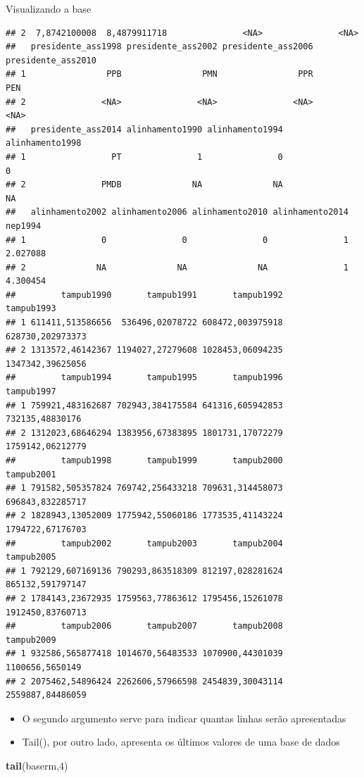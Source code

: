 \documentclass[
  10pt,
  ignorenonframetext,
]{beamer}
\newenvironment{Shaded}{\begin{snugshade}}{\end{snugshade}}
\newcommand{\DecValTok}[1]{\textcolor[rgb]{0.00,0.00,0.81}{#1}}
\newcommand{\KeywordTok}[1]{\textcolor[rgb]{0.13,0.29,0.53}{\textbf{#1}}}
\newcommand{\NormalTok}[1]{#1}
\providecommand{\tightlist}{%
  \setlength{\itemsep}{0pt}\setlength{\parskip}{0pt}}
\begin{document}
\begin{frame}[fragile]{Visualizando a base}
\begin{verbatim}
## 2  7,8742100008  8,4879911718               <NA>               <NA>
##   presidente_ass1998 presidente_ass2002 presidente_ass2006 presidente_ass2010
## 1                PPB                PMN                PPR                PEN
## 2               <NA>               <NA>               <NA>               <NA>
##   presidente_ass2014 alinhamento1990 alinhamento1994 alinhamento1998
## 1                 PT               1               0               0
## 2               PMDB              NA              NA              NA
##   alinhamento2002 alinhamento2006 alinhamento2010 alinhamento2014  nep1994
## 1               0               0               0               1 2.027088
## 2              NA              NA              NA               1 4.300454
##         tampub1990       tampub1991       tampub1992       tampub1993
## 1 611411,513586656  536496,02078722 608472,003975918 628730,202973373
## 2 1313572,46142367 1194027,27279608 1028453,06094235 1347342,39625056
##         tampub1994       tampub1995       tampub1996       tampub1997
## 1 759921,483162687 702943,384175584 641316,605942853  732135,48830176
## 2 1312023,68646294 1383956,67383895 1801731,17072279 1759142,06212779
##         tampub1998       tampub1999       tampub2000       tampub2001
## 1 791582,505357824 769742,256433218 709631,314458073 696843,832285717
## 2 1828943,13052009 1775942,55060186 1773535,41143224 1794722,67176703
##         tampub2002       tampub2003       tampub2004       tampub2005
## 1 792129,607169136 790293,863518309 812197,028281624 865132,591797147
## 2 1784143,23672935 1759563,77863612 1795456,15261078 1912450,83760713
##         tampub2006       tampub2007       tampub2008       tampub2009
## 1 932586,565877418 1014670,56483533 1070900,44301039  1100656,5650149
## 2 2075462,54896424 2262606,57966598 2454839,30043114 2559887,84486059
\end{verbatim}

\begin{itemize}
\tightlist
\item
  O segundo argumento serve para indicar quantas linhas serão
  apresentadas
\item
  Tail(), por outro lado, apresenta os últimos valores de uma base de
  dados
\end{itemize}

\begin{Shaded}
\begin{Highlighting}[]
\KeywordTok{tail}\NormalTok{(baserm,}\DecValTok{4}\NormalTok{)}
\end{Highlighting}
\end{Shaded}


\end{frame}
\end{document}
